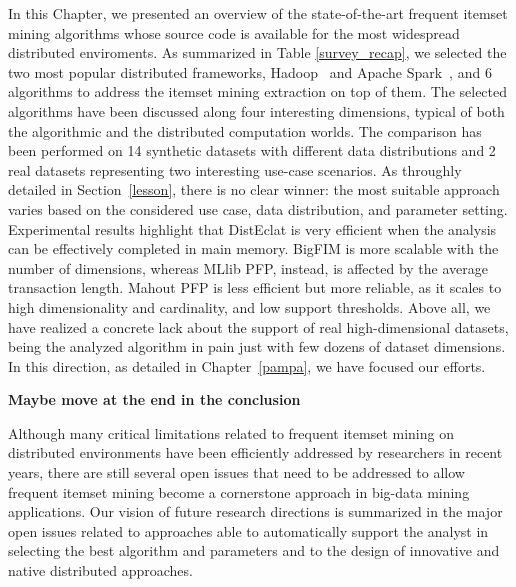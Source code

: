 
In this Chapter, we presented an overview of the state-of-the-art frequent
itemset mining algorithms
whose source code is available for the most widespread distributed enviroments.
As summarized in Table \ref{survey_recap}, we selected the two
most popular distributed frameworks,
Hadoop~\cite{HDFS} and Apache Spark~\cite{Zaharia_spark}, and 6 algorithms to
address the itemset mining extraction on top of them.
The selected algorithms have been discussed along four interesting dimensions,
typical of both the algorithmic and the distributed computation worlds.
The comparison has been performed on 14 synthetic datasets with
different data distributions and 2 real datasets representing two interesting
use-case scenarios.
As throughly detailed in Section~\ref{lesson}, there is no clear winner:
the most suitable approach varies based on the considered use case, data distribution, and parameter setting.
Experimental results highlight that DistEclat
is very efficient when the analysis can be effectively
completed in main memory.
BigFIM is more scalable with the number of dimensions,
whereas MLlib PFP, instead, is affected by the average transaction length.
Mahout PFP is less efficient but more reliable,
as it scales to high dimensionality and cardinality,
and low support thresholds.
Above all, we have realized a concrete lack about the support of real high-dimensional datasets, being
the analyzed algorithm in pain just with few dozens of dataset dimensions. In this direction, as detailed in Chapter~\ref{pampa}, we have focused our efforts.

\textbf{Maybe move at the end in the conclusion}

Although many critical limitations related
to frequent itemset mining on distributed environments have been efficiently
addressed by researchers in recent years, there are still several
open issues that need to be addressed
to allow frequent itemset mining become a cornerstone approach
in big-data mining applications.
Our vision of future research directions is
summarized in the major open issues related to approaches able to automatically support the analyst
in selecting the best algorithm and parameters and to the design of innovative and native distributed approaches.


